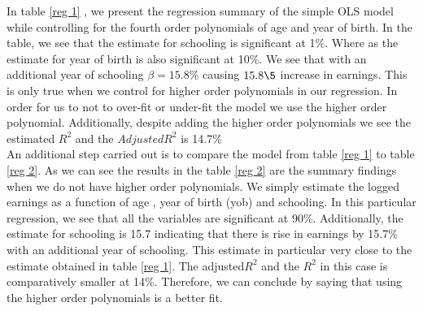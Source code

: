 \documentclass[a4paper,12pt,oneside,English]{article}
\begin{document}
In table \ref{reg 1} , we present the regression summary of the simple OLS model while controlling for the fourth order polynomials of age and year of birth. In the table, we see that the estimate for schooling is significant at 1\%. Where as the estimate for year of birth is also significant at 10\%. We see that with an additional year of schooling $\beta = 15.8$\% causing $15.8\5$ increase in earnings. This is only true when we control for higher order polynomials in our regression. In order for us to not to over-fit or under-fit the model we use the higher order polynomial. Additionally, despite adding the higher order polynomials we see the estimated $R^2$ and the $Adjusted R^2$  is 14.7\%\\

An additional step carried out is to compare the model from table \ref{reg 1} to table \ref{reg 2}. As we can see the results in the table \ref{reg 2}
are the summary findings when we do not have higher order polynomials. We simply estimate the logged earnings as a function of age , year of birth (yob) and schooling. In this particular regression, we see that all the variables are significant at 90\%. Additionally, the estimate for schooling is 15.7 indicating that there is rise in earnings by 15.7\% with an additional year of schooling. This estimate in particular very close to the estimate obtained in table \ref{reg 1}. The adjusted$R^2$ and the $R^2$ in this case is comparatively smaller at 14\%. Therefore, we can conclude by saying that using the higher order polynomials is a better fit.\\
\end{document}
